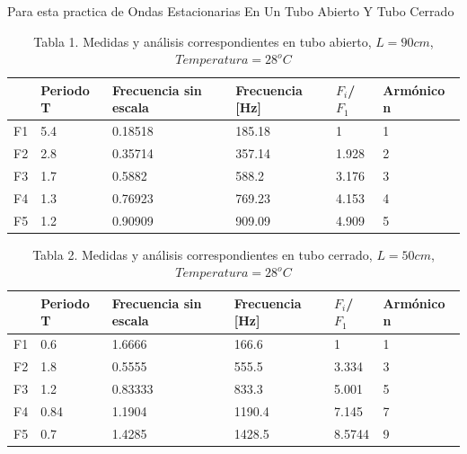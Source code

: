 \documentclass{article}
\begin{document}
Para esta practica de Ondas Estacionarias En Un Tubo Abierto Y Tubo Cerrado 
\begin{table}[H]
\centering
\begin{tabular}{l|l|l|l|l|l|}
\cline{2-6}
                         & Periodo T & Frecuencia sin escala & Frecuencia {[}Hz{]} & $F_{i}$/ $F_{1}$  & Armónico n \\ \hline
\multicolumn{1}{|l|}{F1} & 5.4       & 0.18518               & 185.18              & 1     & 1          \\ \hline
\multicolumn{1}{|l|}{F2} & 2.8       & 0.35714               & 357.14              & 1.928 & 2          \\ \hline
\multicolumn{1}{|l|}{F3} & 1.7       & 0.5882                & 588.2               & 3.176 & 3          \\ \hline
\multicolumn{1}{|l|}{F4} & 1.3       & 0.76923               & 769.23              & 4.153 & 4          \\ \hline
\multicolumn{1}{|l|}{F5} & 1.2       & 0.90909               & 909.09              & 4.909 & 5          \\ \hline
\end{tabular}
\caption{Tabla 1. Medidas y análisis correspondientes en tubo abierto, $L=90cm$, $Temperatura=28^oC$}
\label{tabla1}
\end{table}
\begin{table}[h ]
\centering
\begin{tabular}{l|l|l|l|l|l|}
\cline{2-6}
                         & Periodo T & Frecuencia sin escala & Frecuencia {[}Hz{]} &  $F_{i}$/ $F_{1}$  & Armónico n \\ \hline
\multicolumn{1}{|l|}{F1} & 0.6       & 1.6666                & 166.6               & 1      & 1          \\ \hline
\multicolumn{1}{|l|}{F2} & 1.8       & 0.5555                & 555.5               & 3.334  & 3          \\ \hline
\multicolumn{1}{|l|}{F3} & 1.2       & 0.83333               & 833.3               & 5.001  & 5          \\ \hline
\multicolumn{1}{|l|}{F4} & 0.84      & 1.1904                & 1190.4              & 7.145  & 7          \\ \hline
\multicolumn{1}{|l|}{F5} & 0.7       & 1.4285                & 1428.5              & 8.5744 & 9          \\ \hline
\end{tabular}
\caption{Tabla 2. Medidas y análisis correspondientes en tubo cerrado, $L=50cm$, $Temperatura=28^oC$}
\label{tabla2}
\end{table}
\end{document}
